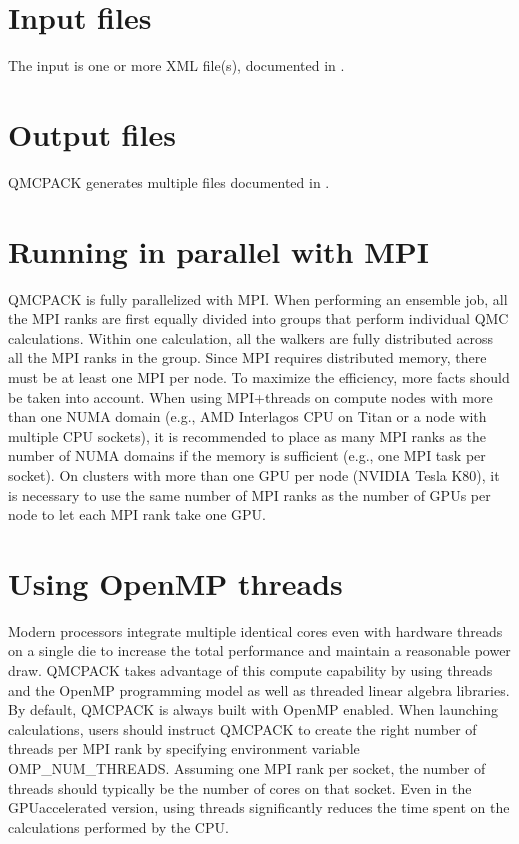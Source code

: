 \documentclass[letterpaper,10pt,english]{sphinxmanual}
\begin{document}
\section{Input files}
\label{\detokenize{running:input-files}}\label{\detokenize{running:inputs}}
The input is one or more XML file(s), documented in {\hyperref[\detokenize{input_overview:input-overview}]{}}.


\section{Output files}
\label{\detokenize{running:output-files}}
QMCPACK generates multiple files documented in .


\section{Running in parallel with MPI}
\label{\detokenize{running:running-in-parallel-with-mpi}}\label{\detokenize{running:parallelrunning}}
QMCPACK is fully parallelized with MPI. When performing an ensemble job, all
the MPI ranks are first equally divided into groups that perform individual
QMC calculations. Within one calculation, all the walkers are fully distributed
across all the MPI ranks in the group. Since MPI requires distributed memory,
there must be at least one MPI per node. To maximize the efficiency, more facts
should be taken into account. When using MPI+threads on compute nodes with more
than one NUMA domain (e.g., AMD Interlagos CPU on Titan or a node with multiple
CPU sockets), it is recommended to place as many MPI ranks as the number of
NUMA domains if the memory is sufficient (e.g., one MPI task per socket). On clusters with more than one
GPU per node (NVIDIA Tesla K80), it is necessary to use the same number of MPI
ranks as the number of GPUs per node to let each MPI rank take one GPU.


\section{Using OpenMP threads}
\label{\detokenize{running:using-openmp-threads}}\label{\detokenize{running:openmprunning}}
Modern processors integrate multiple identical cores even with
hardware threads on a single die to increase the total performance and
maintain a reasonable power draw. QMCPACK takes advantage of this
compute capability by using threads and the OpenMP programming model
as well as threaded linear algebra libraries. By default, QMCPACK is
always built with OpenMP enabled. When launching calculations, users
should instruct QMCPACK to create the right number of threads per MPI
rank by specifying environment variable OMP\_NUM\_THREADS. Assuming
one MPI rank per socket, the number of threads should typically be the
number of cores on that socket. Even in the GPU\sphinxhyphen{}accelerated version,
using threads significantly reduces the time spent on the calculations
performed by the CPU.
\end{document}
